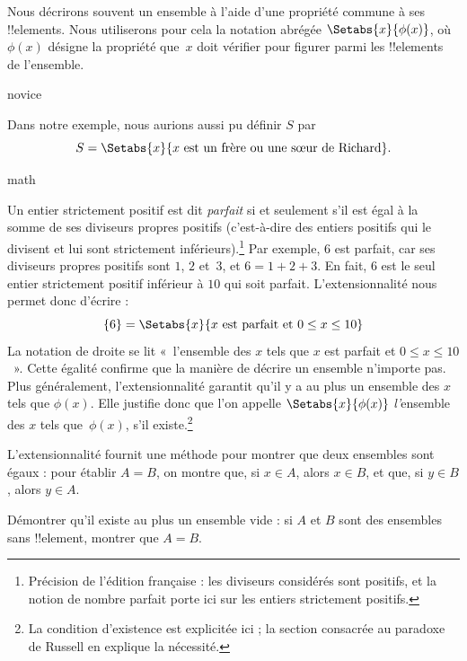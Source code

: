 \documentclass[11pt,a4paper,openany]{memoir}
\begin{document}
Nous décrirons souvent un ensemble à l'aide d'une propriété commune
à ses !!{element}s. Nous utiliserons pour cela la notation abrégée
$\Setabs{x}{\phi(x)}$, où $\phi(x)$ désigne la propriété que~$x$
doit vérifier pour figurer parmi les !!{element}s de l'ensemble.

\begin{tagblock}{novice}
\begin{ex}
Dans notre exemple, nous aurions aussi pu définir $S$ par
\[
S = \Setabs{x}{x \text{ est un frère ou une sœur de Richard}}.
\]
\end{ex}
\end{tagblock}

\begin{tagblock}{math}
\begin{ex}
Un entier strictement positif est dit \emph{parfait} si et seulement
s'il est égal à la somme de ses diviseurs propres positifs
(c'est-à-dire des entiers positifs qui le divisent et lui sont
strictement inférieurs).\footnote{Précision de l'édition française :
les diviseurs considérés sont positifs, et la notion de nombre parfait
porte ici sur les entiers strictement positifs.}
Par exemple, $6$ est parfait, car ses diviseurs propres positifs
sont $1$, $2$ et~$3$, et $6 = 1 + 2 + 3$. En fait, $6$ est le seul
entier strictement positif inférieur à $10$ qui soit parfait.
L'extensionnalité nous permet donc d'écrire :
\[
	\{6\} = \Setabs{x}{x\text{ est parfait et }0 \leq x \leq 10}
\]
La notation de droite se lit «~l'ensemble des $x$ tels que $x$
est parfait et $0 \leq x \leq 10$~». Cette égalité confirme que
la manière de décrire un ensemble n'importe pas. Plus généralement,
l'extensionnalité garantit qu'il y a au plus un ensemble des $x$
tels que $\phi(x)$. Elle justifie donc que l'on appelle
$\Setabs{x}{\phi(x)}$ \emph{l'}ensemble des $x$ tels que~$\phi(x)$,
s'il existe.\footnote{La condition d'existence est explicitée ici ;
la section consacrée au paradoxe de Russell en explique la nécessité.}
\end{ex}
\end{tagblock}

L'extensionnalité fournit une méthode pour montrer que deux ensembles
sont égaux : pour établir $A = B$, on montre que, si $x \in A$,
alors $x \in B$, et que, si $y \in B$, alors $y \in A$.

\begin{prob}
Démontrer qu'il existe au plus un ensemble vide : si $A$ et $B$ sont
des ensembles sans !!{element}, montrer que $A = B$.
\end{prob}
\end{document}
